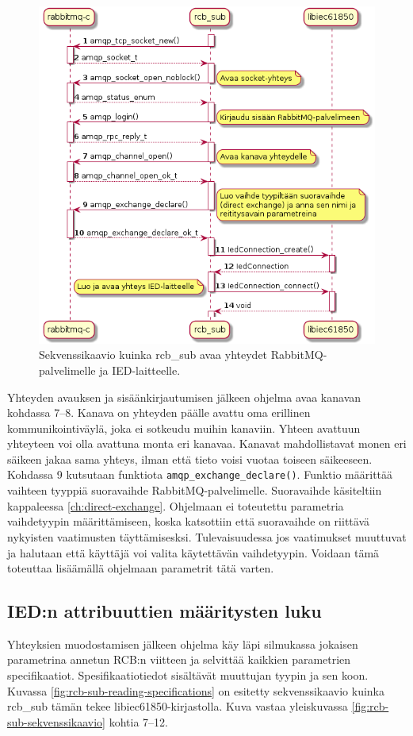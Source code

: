 \begin{figure}[ht!]
	\includegraphics[width=1\textwidth]{pictures/rcb-sub-open-connections.png}
	\caption{Sekvenssikaavio kuinka rcb\_sub avaa yhteydet RabbitMQ-palvelimelle ja IED-laitteelle.}
	\label{fig:rcb-sub-open-connections}
\end{figure}

Yhteyden avauksen ja sisäänkirjautumisen jälkeen ohjelma avaa kanavan kohdassa 7--8. Kanava on yhteyden päälle avattu oma erillinen kommunikointiväylä, joka ei sotkeudu muihin kanaviin. Yhteen avattuun yhteyteen voi olla avattuna monta eri kanavaa. Kanavat mahdollistavat monen eri säikeen jakaa sama yhteys, ilman että tieto voisi vuotaa toiseen säikeeseen. Kohdassa 9 kutsutaan funktiota \texttt{amqp\_exchange\_declare()}. Funktio määrittää vaihteen tyyppiä suoravaihde RabbitMQ-palvelimelle. Suoravaihde käsiteltiin kappaleessa \ref{ch:direct-exchange}. Ohjelmaan ei toteutettu parametria vaihdetyypin määrittämiseen, koska katsottiin että suoravaihde on riittävä nykyisten vaatimusten täyttämisesksi. Tulevaisuudessa jos vaatimukset muuttuvat ja halutaan että käyttäjä voi valita käytettävän vaihdetyypin. Voidaan tämä toteuttaa lisäämällä ohjelmaan parametrit tätä varten.


\subsection{IED:n attribuuttien määritysten luku}
Yhteyksien muodostamisen jälkeen ohjelma käy läpi silmukassa jokaisen parametrina annetun RCB:n viitteen ja selvittää kaikkien parametrien specifikaatiot. Spesifikaatiotiedot sisältävät muuttujan tyypin ja sen koon. Kuvassa \ref{fig:rcb-sub-reading-specifications} on esitetty sekvenssikaavio kuinka rcb\_sub tämän tekee libiec61850-kirjastolla. Kuva vastaa yleiskuvassa \ref{fig:rcb-sub-sekvenssikaavio} kohtia 7--12.

